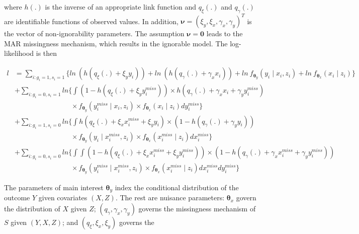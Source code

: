 \documentclass[twoside]{article}
\begin{document}
where $h(.)$ is the inverse of an appropriate link function and $q_{\xi}(.)$ and $q_{\gamma}(.)$ are identifiable functions of observed values. In addition, $\pmb\nu=(\xi_{y},\xi_{x},\gamma_{x},\gamma_{y})^{T}$ is the vector of non-ignorability parameters. The assumption $\pmb\nu=\mathbf{0}$ leads to the MAR
missingness mechanism, which results in the ignorable model.
The log-likelihood is then
\begin{small}\begin{align}
l&=\sum_{i:g_i=1,s_i=1}\bigg\{ln~(h(q_{\xi}(.)+\xi_{y}y_i))+ln~(h(q_{\gamma}(.)+\gamma_xx_i))+ln ~ f_{\pmb\theta_y}(y_i\mid x_i, z_i)+ln ~ f_{\pmb\theta_x}(x_i\mid z_i)\bigg\}\nonumber\\
&+\sum_{i:g_i=0,s_i=1}ln\bigg\{ \int \left( 1-h(q_{\xi}(.)+\xi_{y}y_{i}^{miss})\right)\times h(q_{\gamma}(.)+\gamma_{x}x_i+\gamma_{y}y_{i}^{miss})\nonumber\\
& \qquad\qquad\qquad\qquad \times f_{\pmb\theta_y}(y_{i}^{miss}\mid x_i, z_i)\times f_{\pmb\theta_x}(x_i\mid z_i)dy_{i}^{miss}\bigg\}\nonumber\\
&+\sum_{i:g_i=1,s_i=0}ln\bigg\{ \int  h(q_{\xi}(.)+\xi_{x}x_{i}^{miss}+\xi_{y}y_i)\times (1-h(q_{\gamma}(.)+\gamma_{y}y_i))\nonumber\\
& \qquad\qquad\qquad\qquad \times f_{\pmb\theta_y}(y_{i}\mid x_{i}^{miss}, z_i)\times f_{\pmb\theta_x}(x_{i}^{miss}\mid z_i)dx_{i}^{miss}\bigg\}\nonumber\\
&+\sum_{i:g_i=0,s_i=0}ln\bigg\{ \int \int (1-h(q_{\xi}(.)+\xi_{x}x_{i}^{miss}+\xi_{y}y_{i}^{miss}))\times (1- h(q_{\gamma}(.)+\gamma_{x}x_{i}^{miss}+\gamma_{y}y_{i}^{miss}))\nonumber\\
& \qquad\qquad\qquad\qquad \times f_{\pmb\theta_y}(y_{i}^{miss}\mid x_{i}^{miss}, z_i)\times f_{\pmb\theta_x}(x_{i}^{miss}\mid z_i)dx_{i}^{miss}dy_{i}^{miss}\bigg\}
\label{Likelihood}
\end{align}\end{small}
The parameters of main interest $\pmb\theta_y$ index the conditional
distribution of the outcome $Y$ given covariates $(X, Z)$. The
rest are nuisance parameters: $\pmb\theta_x$ govern the distribution
of $X$ given $Z$; $(q_{\gamma}, \gamma_{x},\gamma_{y})$ governs the missingness mechanism
of $S$ given $(Y, X, Z)$; and $(q_{\xi}, \xi_{x},\xi_{y})$ governs the
\end{document}
